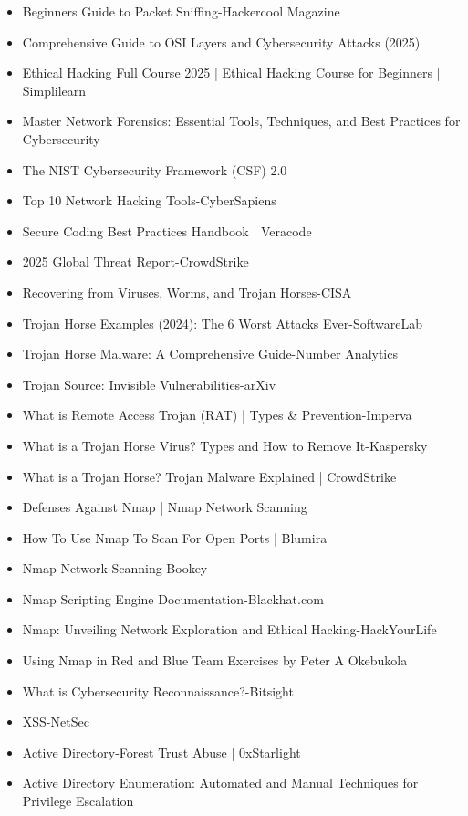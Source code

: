\begin{itemize}
    \item Beginners Guide to Packet Sniffing-Hackercool Magazine
    \item Comprehensive Guide to OSI Layers and Cybersecurity Attacks (2025)
    \item Ethical Hacking Full Course 2025 | Ethical Hacking Course for Beginners | Simplilearn
    \item Master Network Forensics: Essential Tools, Techniques, and Best Practices for Cybersecurity
    \item The NIST Cybersecurity Framework (CSF) 2.0
    \item Top 10 Network Hacking Tools-CyberSapiens
    \item Secure Coding Best Practices Handbook | Veracode
    \item 2025 Global Threat Report-CrowdStrike
    \item Recovering from Viruses, Worms, and Trojan Horses-CISA
    \item Trojan Horse Examples (2024): The 6 Worst Attacks Ever-SoftwareLab
    \item Trojan Horse Malware: A Comprehensive Guide-Number Analytics
    \item Trojan Source: Invisible Vulnerabilities-arXiv
    \item What is Remote Access Trojan (RAT) | Types \& Prevention-Imperva
    \item What is a Trojan Horse Virus? Types and How to Remove It-Kaspersky
    \item What is a Trojan Horse? Trojan Malware Explained | CrowdStrike
    \item Defenses Against Nmap | Nmap Network Scanning
    \item How To Use Nmap To Scan For Open Ports | Blumira
    \item Nmap Network Scanning-Bookey
    \item Nmap Scripting Engine Documentation-Blackhat.com
    \item Nmap: Unveiling Network Exploration and Ethical Hacking-HackYourLife
    \item Using Nmap in Red and Blue Team Exercises by Peter A Okebukola
    \item What is Cybersecurity Reconnaissance?-Bitsight
    \item XSS-NetSec
    \item Active Directory-Forest Trust Abuse | 0xStarlight
    \item Active Directory Enumeration: Automated and Manual Techniques for Privilege Escalation

\end{itemize}
